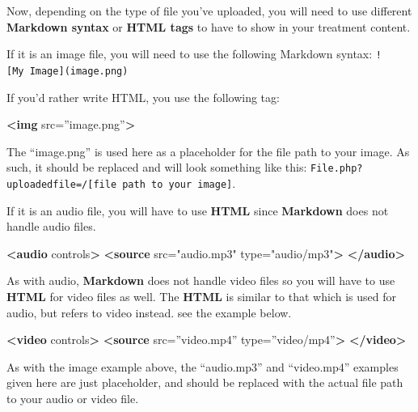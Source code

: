 \documentclass[]{book}
\newenvironment{Shaded}{\begin{snugshade}}{\end{snugshade}}
\newcommand{\KeywordTok}[1]{\textcolor[rgb]{0.13,0.29,0.53}{\textbf{#1}}}
\newcommand{\OtherTok}[1]{\textcolor[rgb]{0.56,0.35,0.01}{#1}}
\newcommand{\StringTok}[1]{\textcolor[rgb]{0.31,0.60,0.02}{#1}}
\begin{document}
Now, depending on the type of file you've uploaded, you will need to use different \textbf{Markdown syntax} or \textbf{HTML tags} to have to show in your treatment content.

If it is an image file, you will need to use the following Markdown syntax:
\texttt{!{[}My\ Image{]}(image.png)}

If you'd rather write HTML, you use the following tag:

\begin{Shaded}
\begin{Highlighting}[]
\KeywordTok{<img}\OtherTok{ src=}\StringTok{”image.png”}\KeywordTok{>}
\end{Highlighting}
\end{Shaded}

The ``image.png'' is used here as a placeholder for the file path to your image. As such, it should be replaced and will look something like this: \texttt{File.php?uploadedfile=/{[}file\ path\ to\ your\ image{]}}.

If it is an audio file, you will have to use \textbf{HTML} since \textbf{Markdown} does not handle audio files.

\begin{Shaded}
\begin{Highlighting}[]
\KeywordTok{<audio}\OtherTok{ controls}\KeywordTok{>}
  \KeywordTok{<source}\OtherTok{ src=}\StringTok{"audio.mp3"}\OtherTok{ type=}\StringTok{"audio/mp3"}\KeywordTok{>}
\KeywordTok{</audio>}
\end{Highlighting}
\end{Shaded}

As with audio, \textbf{Markdown} does not handle video files so you will have to use \textbf{HTML} for video files as well. The \textbf{HTML} is similar to that which is used for audio, but refers to video instead. see the example below.

\begin{Shaded}
\begin{Highlighting}[]
\KeywordTok{<video}\OtherTok{ controls}\KeywordTok{>}
  \KeywordTok{<source}\OtherTok{ src=}\StringTok{”video.mp4”}\OtherTok{ type=}\StringTok{”video/mp4”}\KeywordTok{>}
\KeywordTok{</video>}
\end{Highlighting}
\end{Shaded}

As with the image example above, the ``audio.mp3'' and ``video.mp4'' examples given here are just placeholder, and should be replaced with the actual file path to your audio or video file.
\end{document}
